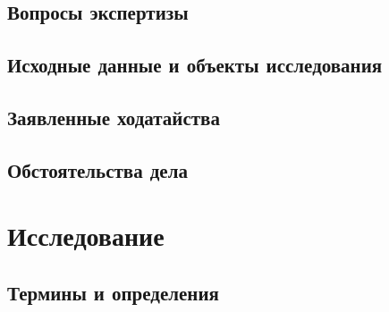 










\thispagestyle{empty} 

%
%

\subsection{Вопросы экспертизы}


\subsection{Исходные данные и объекты исследования}


\subsection{Заявленные ходатайства}


\subsection{Обстоятельства дела}


%

\printbibliography

\section{Исследование}

\subsection{Термины и определения}


